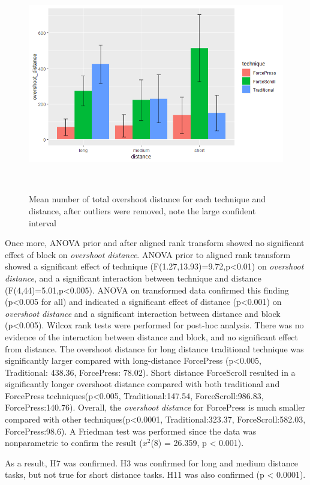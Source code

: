 \documentclass{sigchi}
\begin{document}
\begin{figure}[!h]
    \centering
    \includegraphics[width=0.8\columnwidth]{figures/figure6}
    \caption{Mean number of total overshoot distance for each technique and distance, after outliers were removed, note the large confident interval}~\label{fig:figure7}
\end{figure}

Once more, ANOVA prior and after aligned rank transform showed no significant effect of block on \textit{overshoot distance}. ANOVA prior to aligned rank transform showed a significant effect of technique (F(1.27,13.93)=9.72,p<0.01) on \textit{overshoot distance}, and a significant interaction between technique and distance (F(4,44)=5.01,p<0.005). ANOVA on transformed data confirmed this finding (p<0.005 for all) and indicated a significant effect of distance (p<0.001) on \textit{overshoot distance} and a significant interaction between distance and block (p<0.005). Wilcox rank tests were performed for post-hoc analysis. There was no evidence of the interaction between distance and block, and no significant effect from distance. The overshoot distance for long distance traditional technique was significantly larger compared with long-distance ForcePress (p<0.005, Traditional: 438.36, ForcePress: 78.02). Short distance ForceScroll resulted in a significantly longer overshoot distance compared with both traditional and ForcePress techniques(p<0.005, Traditional:147.54, ForceScroll:986.83, ForcePress:140.76). Overall, the \textit{overshoot distance} for ForcePress is much smaller compared with other techniques(p<0.0001, Traditional:323.37, ForceScroll:582.03, ForcePress:98.6). A Friedman test was performed since the data was nonparametric to confirm the result ($x^{2}$(8) = 26.359, p < 0.001).

As a result, H7 was confirmed. H3 was confirmed for long and medium distance tasks, but not true for short distance tasks. H11 was also confirmed (p < 0.0001).  
\end{document}
